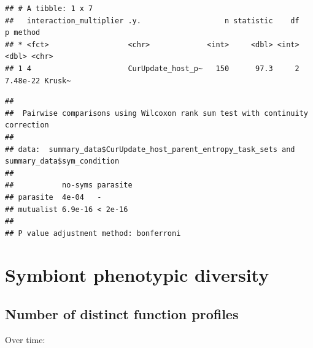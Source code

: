 \documentclass[
]{book}
\newenvironment{Shaded}{\begin{snugshade}}{\end{snugshade}}
\newcommand{\AttributeTok}[1]{\textcolor[rgb]{0.77,0.63,0.00}{#1}}
\newcommand{\ConstantTok}[1]{\textcolor[rgb]{0.00,0.00,0.00}{#1}}
\newcommand{\FunctionTok}[1]{\textcolor[rgb]{0.00,0.00,0.00}{#1}}
\newcommand{\NormalTok}[1]{#1}
\newcommand{\SpecialCharTok}[1]{\textcolor[rgb]{0.00,0.00,0.00}{#1}}
\newcommand{\StringTok}[1]{\textcolor[rgb]{0.31,0.60,0.02}{#1}}
\begin{document}
\begin{verbatim}
## # A tibble: 1 x 7
##   interaction_multiplier .y.                   n statistic    df        p method
## * <fct>                  <chr>             <int>     <dbl> <int>    <dbl> <chr> 
## 1 4                      CurUpdate_host_p~   150      97.3     2 7.48e-22 Krusk~
\end{verbatim}

\begin{Shaded}
\end{Shaded}

\begin{verbatim}
## 
##  Pairwise comparisons using Wilcoxon rank sum test with continuity correction 
## 
## data:  summary_data$CurUpdate_host_parent_entropy_task_sets and summary_data$sym_condition 
## 
##           no-syms parasite
## parasite  4e-04   -       
## mutualist 6.9e-16 < 2e-16 
## 
## P value adjustment method: bonferroni
\end{verbatim}

\hypertarget{symbiont-phenotypic-diversity-1}{%
\section{Symbiont phenotypic diversity}\label{symbiont-phenotypic-diversity-1}}

\hypertarget{number-of-distinct-function-profiles-3}{%
\subsection{Number of distinct function profiles}\label{number-of-distinct-function-profiles-3}}

Over time:
\end{document}
